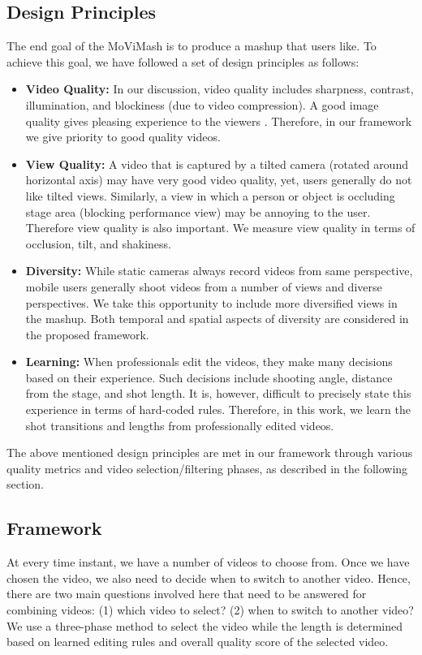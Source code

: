 \documentclass{sig-alternate}
\begin{document}
\subsection{Design Principles}
The end goal of the MoViMash is to produce a mashup that users
like. To achieve this goal, we have followed a set of design principles as follows:
\begin{itemize}
    \item \textbf{Video Quality:} In our discussion, video quality includes sharpness, contrast, illumination, and blockiness (due to video compression). A good image quality gives pleasing experience to the viewers \cite{10}. Therefore, in our framework we give priority to good quality videos.
    \item \textbf{View Quality:} A video that is captured by a tilted camera (rotated around horizontal axis) may have very good video quality, yet, users generally do not like tilted views. Similarly, a view in which a person or object is occluding stage area (blocking performance view) may be annoying to the user. Therefore view quality is also important. We measure view quality in terms of occlusion, tilt, and shakiness.
    \item \textbf{Diversity:} While static cameras always record videos from same perspective, mobile users generally shoot videos from a number of views and diverse perspectives. We take this opportunity to include more diversified views in the mashup. Both temporal and spatial aspects of diversity are considered in the proposed framework.
    \item \textbf{Learning:} When professionals edit the videos, they make many decisions based on their experience. Such decisions include shooting angle, distance from the stage, and shot length. It is, however, difficult to precisely state this experience in terms of hard-coded rules. Therefore, in this work, we learn the shot transitions and lengths from professionally edited videos.
\end{itemize}
The above mentioned design principles are met in our framework through various quality metrics and video selection/filtering phases, as described in the following section.

\subsection{Framework}
At every time instant, we have a number of videos to choose from. Once we have chosen the video, we also need to decide when to switch to another video. Hence, there are two main questions involved here that need to be answered for combining videos: (1) which video to select? (2) when to switch to another video? We use a three-phase method to select the video while the length is determined based on learned editing rules and overall quality score of the selected video.
\end{document}

